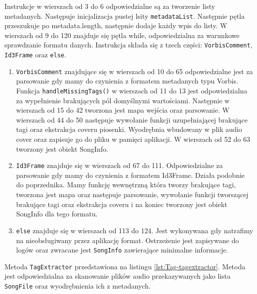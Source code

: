 Instrukcje w wierszach od 3 do 6 odpowiedzialne są za tworzenie listy metadanych. Następuje inicjalizacja pustej lsity \texttt{metadataList}. Następnie pętla przeszukuje po metadata.length, następnie dodaje każdy wpis do listy.
W wierszach od 9 do	120 znajduje się pętla while, odpowiedzialna za warunkowe sprawdzanie formatu danych. Instrukcja składa się z tzech części: \texttt{VorbisComment}, \texttt{Id3Frame} oraz \texttt{else}.
\begin{enumerate}
	\item \texttt{VorbisComment} znajdujące się w wierszach od 10 do 65 odpowiedzialne jest za parsowanie gdy mamy do czynienia z formatem metadanych typu Vorbis.
	Funkcja \texttt{handleMissingTags()} w wierszach od 11 do 13 jest odpowiedzialna za wypełnienie brakujących pól domyślnymi wartościami. Następnie w wierszach od 15 do 42 tworzona jest mapa wejścia oraz parsowanie.
	W wierszach od 44 do 50 następuje wywołanie funkcji uzupełniającej brakujące tagi oraz ekstrakcja coveru piosenki. Wyodrębnia wbudowany w plik audio cover oraz zapisuje go do pliku w pamięci aplikacji.
	W wierszach od 52 do 63 tworzony jest obiekt SongInfo.
	
	\item \texttt{Id3Frame} znajduje się w wierszach od 67 do 111. Odpowiedzialne za parsowanie gdy mamy do czynienia z formatem Id3Frame. Działa podobnie do poprzednika. Mamy funkcję wewnętrzną która tworzy brakujące tagi, tworzona jest mapa oraz następuje parsowanie, wywołanie funkcji tworszącej brakujące tagi oraz ekstrakcja coveru i na koniec tworzony jest obiekt SongInfo dla tego formatu.
	
	\item \texttt{else} znajduje się w wierszach od 113 do 124. Jest wykonywana gdy natrafimy na nieobsługiwany przez aplikację format. Ostrzeżenie jest zapisywane do logów oraz zwracane jest \texttt{SongInfo} zawierające minimalne informacje.
\end{enumerate}

Metoda \texttt{TagExtractor} przedstawiona na listingu \ref{lst:Tag-tagextractor}. Metoda jest odpowiedzialna za skanowanie plików audio przekazywanych jako lista \texttt{SongFile} oraz wyodrębnienia ich z metadanych.


